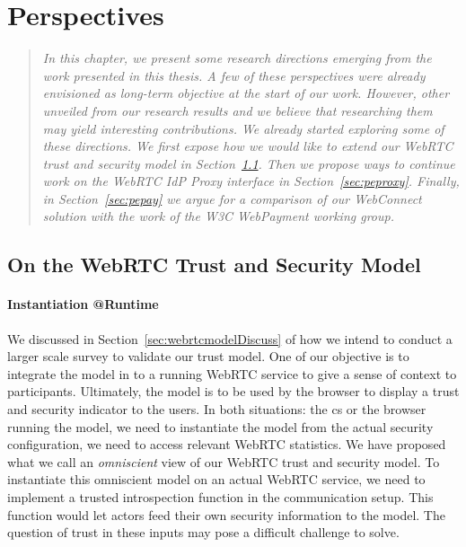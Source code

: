 \chapter{Perspectives}
\label{perspectives}

\begin{quote}
\textit{
In this chapter, we present some research directions emerging from the work presented in this thesis.
A few of these perspectives were already envisioned as long-term objective at the start of our work.
However, other unveiled from our research results and we believe that researching them may yield interesting contributions.
We already started exploring some of these directions.
We first expose how we would like to extend our WebRTC trust and security model in Section~\ref{sec:pemodel}.
Then we propose ways to continue work on the WebRTC IdP Proxy interface in Section~\ref{sec:peproxy}.
Finally, in Section~\ref{sec:pepay} we argue for a comparison of our WebConnect solution with the work of the W3C WebPayment working group.
}
\end{quote}

\glsresetall
\section{On the WebRTC Trust and Security Model}
\label{sec:pemodel}
\subsubsection{Instantiation @Runtime}
We discussed in Section~\ref{sec:webrtcmodelDiscuss} of how we intend to conduct a larger scale survey to validate our trust model.
One of our objective is to integrate the model in to a running WebRTC service to give a sense of context to participants.
Ultimately, the model is to be used by the browser to display a trust and security indicator to the users.
In both situations: the \gls{cs} or the browser running the model, we need to instantiate the model from the actual security configuration, \ie we need to access relevant WebRTC statistics.
We have proposed what we call an \textit{omniscient} view of our WebRTC trust and security model.
To instantiate this omniscient model on an actual WebRTC service, we need to implement a trusted introspection function in the communication setup.
This function would let actors feed their own security information to the model.
The question of trust in these inputs may pose a difficult challenge to solve.

